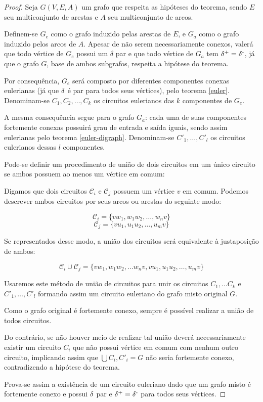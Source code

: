     \begin{proof}
        Seja $G(V, E, A)$ um grafo que respeita as hipóteses do teorema, sendo $E$ seu multiconjunto de arestas e $A$ seu multiconjunto de arcos.

        Definem-se $G_e$ como o grafo induzido pelas arestas de $E$, e $G_a$ como o grafo induzido pelos arcos de $A$.
        Apesar de não serem necessariamente conexos, valerá que todo vértice de $G_e$ possui um $\delta$ par e que todo vértice de $G_a$ tem $\operatorname{\delta^+} = \operatorname{\delta^-}$, já que o grafo $G$, base de ambos subgrafos, respeita a hipótese do teorema.
        
        Por consequência, $G_e$ será composto por diferentes componentes conexas eulerianas (já que $\operatorname{\delta}$ é par para todos seus vértices), pelo teorema \ref{euler}.
        Denominam-se $C_1, C_2, \dots, C_k$  os circuitos eulerianos das $k$ componentes de $G_e$.

        A mesma consequência segue para o grafo $G_a$: cada uma de suas componentes fortemente conexas possuirá grau de entrada e saída iguais, sendo assim eulerianas pelo teorema \ref{euler-digraph}. 
        Denominam-se $C'_1, \dots, C'_l$ os circuitos eulerianos dessas $l$ componentes.

        Pode-se definir um procedimento de união de dois circuitos em um único circuito se ambos possuem ao menos um vértice em comum:
        
        Digamos que dois circuitos $\mathcal{C}_i$ e $\mathcal{C}_j$ possuem um vértice $v$ em comum.
        Podemos descrever ambos circuitos por seus arcos ou arestas do seguinte modo:

        \[
            \mathcal{C}_i = \{ vw_1, w_1w_2, \dots, w_nv \}
        \]
        \[
            \mathcal{C}_j = \{ vu_1, u_1u_2, \dots, u_mv \}
        \]

        Se representados desse modo, a união dos circuitos será equivalente à justaposição de ambos:

        \[
            \mathcal{C}_i \cup \mathcal{C}_j = \{ vw_1, w_1w_2, \dots w_nv, vu_1, u_1u_2, \dots, u_mv \}
        \]
        
        Usaremos este método de união de circuitos para unir os circuitos $C_1, \dots C_k$ e $C'_1, \dots, C'_l$ formando assim um circuito euleriano do grafo misto original $G$.

        Como o grafo original é fortemente conexo, sempre é possível realizar a união de todos circuitos. 

    Do contrário, se não houver meio de realizar tal união deverá necessariamente existir um circuito $C_i$ que não possui vértice em comum com nenhum outro circuito, implicando assim que $\bigcup C_i, C'_i = G$ não seria fortemente conexo, contradizendo a hipótese do teorema.

    Prova-se assim a existência de um circuito euleriano dado que um grafo misto é fortemente conexo e possui $\operatorname{\delta}$ par e $\operatorname{\delta^+} = \operatorname{\delta^-}$ para todos seus vértices.
    \end{proof}

